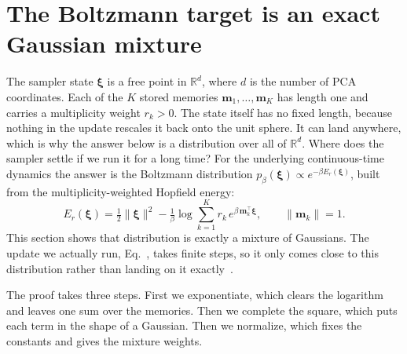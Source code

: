 \section{The Boltzmann target is an exact Gaussian mixture}\label{app:gmm}

The sampler state $\boldsymbol{\xi}$ is a free point in $\mathbb{R}^{d}$, where $d$
is the number of PCA coordinates. Each of the $K$ stored memories
$\mathbf{m}_1,\ldots,\mathbf{m}_K$ has length one and carries a multiplicity weight
$r_k > 0$. The state itself has no fixed length, because nothing in the update
rescales it back onto the unit sphere. It can land anywhere, which is why the answer
below is a distribution over all of $\mathbb{R}^{d}$.
Where does the sampler settle if we run it for a long time? For the underlying
continuous-time dynamics the answer is the Boltzmann distribution
$p_\beta(\boldsymbol{\xi})\propto e^{-\beta E_r(\boldsymbol{\xi})}$, built from the
multiplicity-weighted Hopfield energy:
\begin{equation}
  E_r(\boldsymbol{\xi})
  = \tfrac12\lVert\boldsymbol{\xi}\rVert^2
    - \tfrac1\beta\log\sum_{k=1}^{K} r_k\, e^{\beta\, \mathbf{m}_k^\top\boldsymbol{\xi}},
  \qquad \lVert\mathbf{m}_k\rVert = 1 .
\end{equation}
This section shows that distribution is exactly a mixture of Gaussians. The update
we actually run, Eq.~, takes finite steps, so it only
comes close to this distribution rather than landing on it
exactly~\cite{durmusMoulinesULA2017}.

The proof takes three steps. First we exponentiate, which clears the logarithm and
leaves one sum over the memories. Then we complete the square, which puts each term
in the shape of a Gaussian. Then we normalize, which fixes the constants and gives
the mixture weights.

